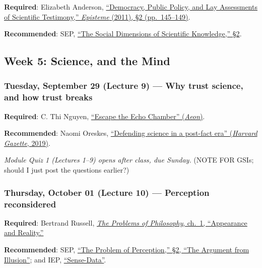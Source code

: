\documentclass[
  letterpaper,
  DIV=11,
  numbers=noendperiod]{scrartcl}
\begin{document}
\textbf{Required}: Elizabeth Anderson,
\href{https://joelvelasco.net/teaching/2330/democracy-public-policy-and-lay-assessments-of-scientific-testimony1.pdf}{``Democracy,
Public Policy, and Lay Assessments of Scientific Testimony,''
\emph{Episteme} (2011), §2 (pp.~145--149)}.

\textbf{Recommended}: SEP,
\href{https://plato.stanford.edu/entries/scientific-knowledge-social/\#BigSciTruAut}{``The
Social Dimensions of Scientific Knowledge,'' §2}.

\subsection{Week 5: Science, and the
Mind}\label{week-5-science-and-the-mind}

\subsubsection{Tuesday, September 29 (Lecture 9) --- Why trust science,
and how trust
breaks}\label{tuesday-september-29-lecture-9-why-trust-science-and-how-trust-breaks}

\textbf{Required}: C. Thi Nguyen,
\href{https://aeon.co/essays/why-its-as-hard-to-escape-an-echo-chamber-as-it-is-to-flee-a-cult}{``Escape
the Echo Chamber'' (\emph{Aeon})}.

\textbf{Recommended}: Naomi Oreskes,
\href{https://news.harvard.edu/gazette/story/2019/10/in-why-trust-science-naomi-oreskes-explains-why-the-process-of-proof-is-worth-trusting/}{``Defending
science in a post-fact era'' (\emph{Harvard Gazette}, 2019)}.

\emph{Module Quiz 1 (Lectures 1--9) opens after class, due Sunday.}
(NOTE FOR GSIs; should I just post the questions earlier?)

\subsubsection{Thursday, October 01 (Lecture 10) --- Perception
reconsidered}\label{thursday-october-01-lecture-10-perception-reconsidered}

\textbf{Required}: Bertrand Russell,
\href{https://www.gutenberg.org/files/5827/5827-h/5827-h.htm}{\emph{The
Problems of Philosophy}, ch.~1, ``Appearance and Reality.''}

\textbf{Recommended}: SEP,
\href{https://plato.stanford.edu/entries/perception-problem/}{``The
Problem of Perception,'' §2, ``The Argument from Illusion''}; and IEP,
\href{https://iep.utm.edu/sense-da/}{``Sense-Data''}.
\end{document}
